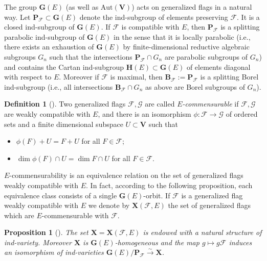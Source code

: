 \documentclass{amsart}
\newtheorem{proposition}{Proposition}
\theoremstyle{definition}
\newtheorem{definition}{Definition}
\begin{document}
The group $\mathbf{G}(E)$ (as well as $\mathrm{Aut}(\mathbf{V})$) acts on generalized flags in a natural way.
Let $\mathbf{P}_\mathcal{F}\subset\mathbf{G}(E)$ denote the ind-subgroup of elements preserving $\mathcal{F}$.
It is a closed ind-subgroup of $\mathbf{G}(E)$.
If $\mathcal{F}$ is compatible with $E$, then $\mathbf{P}_\mathcal{F}$ is a splitting parabolic ind-subgroup of $\mathbf{G}(E)$ in the sense that
it is locally parabolic (i.e., there exists an exhaustion of $\mathbf{G}(E)$ by finite-dimensional reductive algebraic subgroups $G_n$ such that the intersections $\mathbf{P}_\mathcal{F}\cap G_n$ are parabolic subgroups of $G_n$) and contains the Cartan ind-subgroup $\mathbf{H}(E)\subset \mathbf{G}(E)$ of elements diagonal with respect to $E$.
Moreover if $\mathcal{F}$ is maximal, then $\mathbf{B}_\mathcal{F}:=\mathbf{P}_\mathcal{F}$ is a splitting Borel ind-subgroup
(i.e., all intersections $\mathbf{B}_\mathcal{F}\cap G_n$ as above are Borel subgroups of $G_n$).

\begin{definition}[\cite{Dimitrov-Penkov}]
Two generalized flags $\mathcal{F},\mathcal{G}$ are called {\em $E$-commensurable}
if $\mathcal{F},\mathcal{G}$ are weakly compatible with $E$, and there is an isomorphism $\phi:\mathcal{F}\to\mathcal{G}$ of ordered sets and a finite dimensional subspace $U\subset\mathbf{V}$ such that
\begin{itemize}
\item[\rm (i)] $\phi(F)+U=F+U$ for all $F\in\mathcal{F}$;
\item[\rm (ii)] $\dim \phi(F)\cap U=\dim F\cap U$ for all $F\in\mathcal{F}$.
\end{itemize}
\end{definition}

$E$-commensurability is an equivalence relation on the set of generalized flags weakly compatible with $E$. In fact, according to the following proposition, each equivalence class consists of a single $\mathbf{G}(E)$-orbit.
If $\mathcal{F}$ is a generalized flag weakly compatible with $E$ we denote by $\mathbf{X}(\mathcal{F},E)$ the set of generalized flags which are $E$-commensurable with $\mathcal{F}$.

\begin{proposition}[\cite{Dimitrov-Penkov}]
\label{P2.3-1}
The set $\mathbf{X}=\mathbf{X}(\mathcal{F},E)$ is endowed with a natural structure of ind-variety.
Moreover $\mathbf{X}$ is $\mathbf{G}(E)$-homogeneous and the map $g\mapsto g\mathcal{F}$ induces an isomorphism of ind-varieties $\mathbf{G}(E)/\mathbf{P}_\mathcal{F}\stackrel{\sim}{\to}\mathbf{X}$.
\end{proposition}
\end{document}
